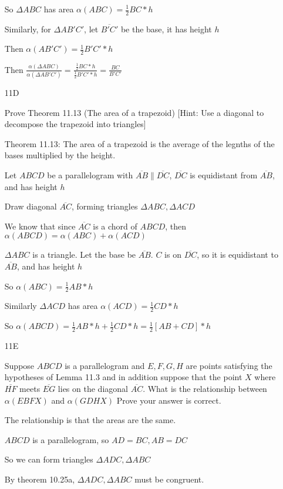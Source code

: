 \documentclass[11pt]{article}
\newcommand{\segment}[1]{\overline{#1}}
\begin{document}
\begin{itemize}
		So $\Delta ABC$ has area $\alpha(ABC) = \frac{1}{2} BC*h$

		Similarly, for $\Delta AB'C'$, let $\segment{B'C'}$ be the base, it has height $h$

		Then $\alpha(AB'C') = \frac{1}{2} B'C'*h$

		Then $\frac{\alpha(\Delta ABC)}{\alpha(\Delta AB'C')} = \frac{\frac{1}{2}BC*h}{\frac{1}{2}B'C'*h} =	\frac{BC}{B'C'}$
	\item[11D]

		Prove Theorem 11.13 (The area of a trapezoid) [Hint: Use a diagonal to decompose the trapezoid into triangles]

		Theorem 11.13: The area of a trapezoid is the average of the legnths of the bases multiplied by the height.

		Let $ABCD$ be a parallelogram with $\segment{AB} \parallel \segment{DC}$, $\segment{DC}$ is equidistant from $\segment{AB}$, and has height $h$

		Draw diagonal $\segment{AC}$, forming triangles $\Delta ABC, \Delta ACD$

		We know that since $\segment{AC}$ is a chord of $ABCD$, then $\alpha(ABCD) = \alpha(ABC) + \alpha(ACD)$

		$\Delta ABC$ is a triangle. Let the base be $\segment{AB}$. $C$ is on $\segment{DC}$, so it is equidistant to $\segment{AB}$, and has height $h$

		So $\alpha(ABC) = \frac{1}{2}AB*h$

		Similarly $\Delta ACD$ has area $\alpha(ACD) = \frac{1}{2}CD*h$

		So $\alpha(ABCD) = \frac{1}{2}AB*h + \frac{1}{2}CD*h = \frac{1}{2}[AB + CD]*h$

	\item[11E]

		Suppose $ABCD$ is a parallelogram and $E,F,G,H$ are points satisfying the hypotheses of Lemma 11.3 and in addition suppose that the point $X$ where $\segment{HF}$ meets $\segment{EG}$ lies on the diagonal $\segment{AC}$. What is the relationship between $\alpha(EBFX)$ and $\alpha(GDHX)$ Prove your answer is correct.

		The relationship is that the areas are the same.

		$ABCD$ is a parallelogram, so $AD = BC, AB = DC$

		So we can form triangles $\Delta ADC, \Delta ABC$

		By theorem 10.25a, $\Delta ADC, \Delta ABC$ must be congruent.


\end{itemize}
\end{document}
